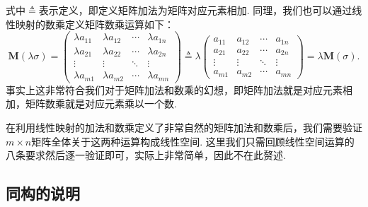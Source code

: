 式中$\triangleq$表示定义，即定义矩阵加法为矩阵对应元素相加. 同理，我们也可以通过线性映射的数乘定义矩阵数乘运算如下：
\[\mathbf{M}(\lambda\sigma)=\begin{pmatrix}
        \lambda a_{11} & \lambda a_{12} & \cdots & \lambda a_{1n} \\
        \lambda a_{21} & \lambda a_{22} & \cdots & \lambda a_{2n} \\
        \vdots         & \vdots         & \ddots & \vdots         \\
        \lambda a_{m1} & \lambda a_{m2} & \cdots & \lambda a_{mn}
    \end{pmatrix}\triangleq\lambda\begin{pmatrix}
        a_{11} & a_{12} & \cdots & a_{1n} \\
        a_{21} & a_{22} & \cdots & a_{2n} \\
        \vdots & \vdots & \ddots & \vdots \\
        a_{m1} & a_{m2} & \cdots & a_{mn}
    \end{pmatrix}=\lambda\mathbf{M}(\sigma).\]
事实上这非常符合我们对于矩阵加法和数乘的幻想，即矩阵加法就是对应元素相加，矩阵数乘就是对应元素乘以一个数.

在利用线性映射的加法和数乘定义了非常自然的矩阵加法和数乘后，我们需要验证$m\times n$矩阵全体关于这两种运算构成线性空间. 这里我们只需回顾线性空间运算的八条要求然后逐一验证即可，实际上非常简单，因此不在此赘述.

\subsection{同构的说明}

